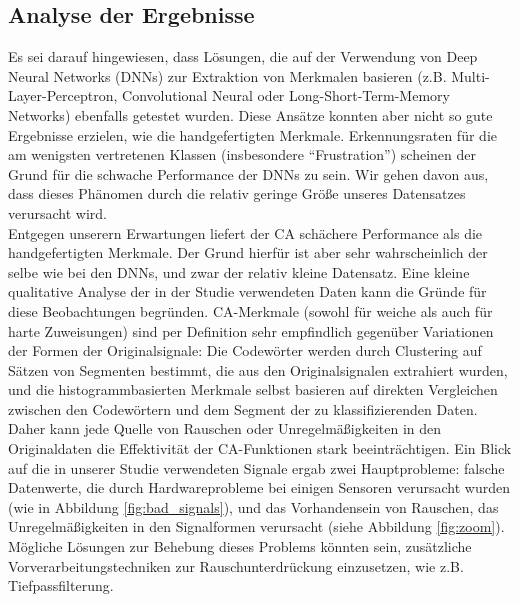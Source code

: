 \subsection{Analyse der Ergebnisse} \label{analyse-subsec}


Es sei darauf hingewiesen, dass L{\"o}sungen, die auf der Verwendung von Deep Neural Networks (DNNs) zur Extraktion von Merkmalen basieren (z.B. Multi-Layer-Perceptron, Convolutional Neural oder Long-Short-Term-Memory Networks) ebenfalls getestet wurden. Diese Ans{\"a}tze konnten aber nicht so gute Ergebnisse erzielen, wie die handgefertigten Merkmale. Erkennungsraten f{\"u}r die am wenigsten vertretenen Klassen (insbesondere ``Frustration'') scheinen der Grund f{\"u}r die schwache Performance der DNNs zu sein. Wir gehen davon aus, dass dieses Ph{\"a}nomen durch die relativ geringe Gr{\"o}{\ss}e unseres Datensatzes verursacht wird. \\

Entgegen unserern Erwartungen liefert der CA sch{\"a}chere Performance als die handgefertigten Merkmale. Der Grund hierf{\"u}r ist aber sehr wahrscheinlich der selbe wie bei den  DNNs, und zwar der relativ kleine Datensatz. 
Eine kleine qualitative Analyse der in der Studie verwendeten Daten kann die Gr{\"u}nde f{\"u}r diese Beobachtungen begr{\"u}nden. 
CA-Merkmale (sowohl f{\"u}r weiche als auch f{\"u}r harte Zuweisungen) sind per Definition sehr empfindlich gegen{\"u}ber Variationen der Formen der Originalsignale: Die Codew{\"o}rter werden durch Clustering auf S{\"a}tzen von Segmenten bestimmt, die aus den Originalsignalen extrahiert wurden, und die histogrammbasierten Merkmale selbst basieren auf direkten Vergleichen zwischen den Codew{\"o}rtern und dem Segment der zu klassifizierenden Daten. 
Daher kann jede Quelle von Rauschen oder Unregelm{\"a}{\ss}igkeiten in den Originaldaten die Effektivit{\"a}t der CA-Funktionen stark beeintr{\"a}chtigen. 
Ein Blick auf die in unserer Studie verwendeten Signale ergab zwei Hauptprobleme: falsche Datenwerte, die durch Hardwareprobleme bei einigen Sensoren verursacht wurden (wie in Abbildung \ref{fig:bad_signals}), und das Vorhandensein von Rauschen, das Unregelm{\"a}{\ss}igkeiten in den Signalformen verursacht (siehe Abbildung \ref{fig:zoom}). M{\"o}gliche L{\"o}sungen zur Behebung dieses Problems k{\"o}nnten sein, zus{\"a}tzliche Vorverarbeitungstechniken zur Rauschunterdr{\"u}ckung einzusetzen, wie z.B. Tiefpassfilterung. \\


